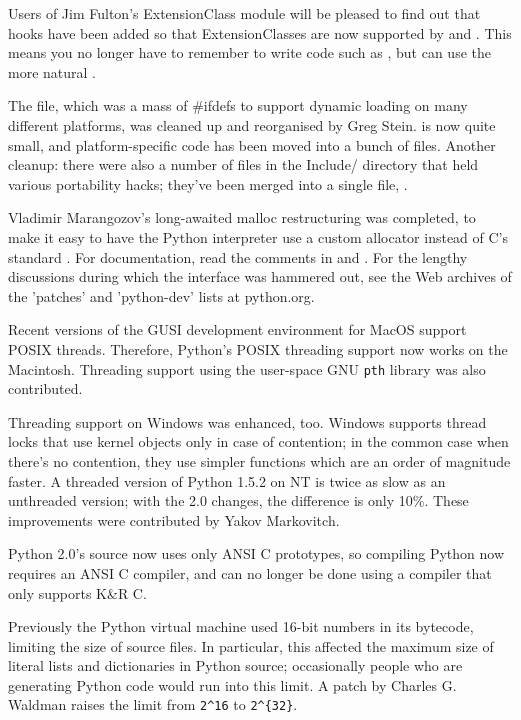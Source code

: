 \documentclass{howto}
\begin{document}
Users of Jim Fulton's ExtensionClass module will be pleased to find
out that hooks have been added so that ExtensionClasses are now
supported by  and .
This means you no longer have to remember to write code such as
, but can use the more natural
.

The  file, which was a mass of \#ifdefs to
support dynamic loading on many different platforms, was cleaned up
and reorganised by Greg Stein.   is now quite small,
and platform-specific code has been moved into a bunch of
 files.  Another cleanup: there were also a
number of  files in the Include/ directory that held
various portability hacks; they've been merged into a single file,
.

Vladimir Marangozov's long-awaited malloc restructuring was completed,
to make it easy to have the Python interpreter use a custom allocator
instead of C's standard .  For documentation, read
the comments in  and
.  For the lengthy discussions during which
the interface was hammered out, see the Web archives of the 'patches'
and 'python-dev' lists at python.org.

Recent versions of the GUSI development environment for MacOS support
POSIX threads.  Therefore, Python's POSIX threading support now works
on the Macintosh.  Threading support using the user-space GNU \texttt{pth}
library was also contributed.

Threading support on Windows was enhanced, too.  Windows supports
thread locks that use kernel objects only in case of contention; in
the common case when there's no contention, they use simpler functions
which are an order of magnitude faster.  A threaded version of Python
1.5.2 on NT is twice as slow as an unthreaded version; with the 2.0
changes, the difference is only 10\%.  These improvements were
contributed by Yakov Markovitch.

Python 2.0's source now uses only ANSI C prototypes, so compiling Python now
requires an ANSI C compiler, and can no longer be done using a compiler that
only supports K\&R C.  

Previously the Python virtual machine used 16-bit numbers in its
bytecode, limiting the size of source files.  In particular, this
affected the maximum size of literal lists and dictionaries in Python
source; occasionally people who are generating Python code would run
into this limit.  A patch by Charles G. Waldman raises the limit from
\verb|2^16| to \verb|2^{32}|.
\end{document}
